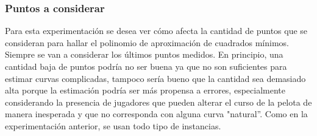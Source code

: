 \subsubsection{Puntos a considerar}
Para esta experimentación se desea ver cómo afecta la cantidad de puntos que se consideran para hallar el polinomio de aproximación de 
cuadrados mínimos. Siempre se van a considerar los últimos puntos medidos. En principio, una cantidad baja de puntos podría no ser 
buena ya que no son suficientes para estimar curvas complicadas, tampoco sería bueno que la cantidad sea demasiado alta porque la 
estimación podría ser más propensa a errores, especialmente considerando la presencia de jugadores que pueden alterar el curso de la 
pelota de manera inesperada y que no corresponda con alguna curva "natural''. Como en la experimentación anterior, se usan todo tipo 
de instancias.


